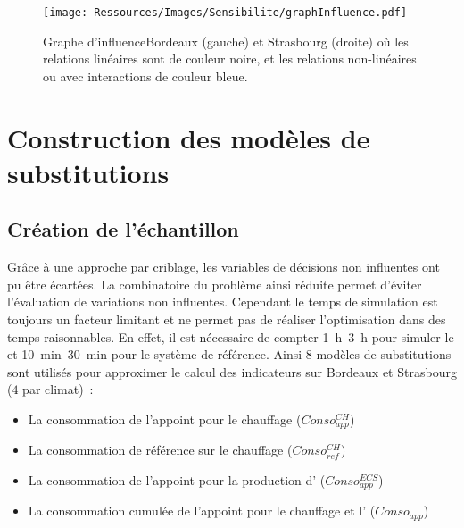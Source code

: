 \begin{figure}
    \centering
    \texttt{[image: Ressources/Images/Sensibilite/graphInfluence.pdf]}
    \caption[Graphe d’influenceBordeaux et Strasbourg]
            {Graphe d’influenceBordeaux (gauche) et Strasbourg (droite) où les
             relations linéaires sont de couleur noire, et les relations non-linéaires ou
             avec interactions de couleur bleue.}
    \label{fig:graphe_influence_objectifs}
\end{figure}






\section{Construction des modèles de substitutions} %
\label{sec:construction_des_modeles_de_substitutions}
\subsection{Création de l’échantillon} %
\label{sub:creation_de_l_echantillon}
Grâce à une approche par criblage, les variables de décisions non influentes ont pu être
écartées. La combinatoire du problème ainsi réduite permet d’éviter l’évaluation de variations non influentes.
Cependant le temps de simulation est toujours un facteur limitant et ne permet pas
de réaliser l’optimisation dans des temps raisonnables. En effet, il est nécessaire de
compter \SIrange{1}{3}{h} pour simuler le  et \SIrange{10}{30}{min} pour
le système de référence.
Ainsi $8$ modèles de substitutions sont utilisés pour approximer le calcul des indicateurs
sur Bordeaux et Strasbourg ($4$ par climat)~:
\begin{itemize}
  \item La consommation de l’appoint pour le chauffage ($Conso_{app}^{CH}$)
  \item La consommation de référence sur le chauffage ($Conso_{ref}^{CH}$)
  \item La consommation de l’appoint pour la production d’ ($Conso_{app}^{ECS}$)
  \item La consommation cumulée de l’appoint pour le chauffage et l’ ($Conso_{app}$)
\end{itemize}

